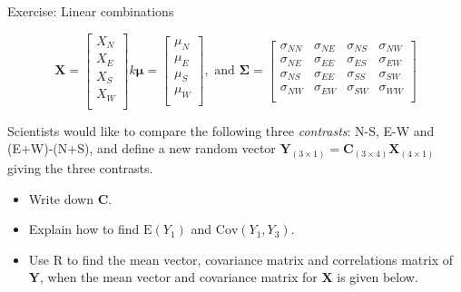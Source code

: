 \documentclass[ignorenonframetext,]{beamer}
\providecommand{\tightlist}{%
  \setlength{\itemsep}{0pt}\setlength{\parskip}{0pt}}
\begin{document}
\begin{frame}

\begin{block}{Exercise: Linear combinations}

\[\mathbf{X}=\left[ \begin{array}{c} X_N\\
          X_E\\
X_S\\
          X_W\\
          \end{array}
          \right]k
          \mathbf{\mu}=\left[
      \begin{array}{c} \mu_N\\
          \mu_E\\
\mu_S\\
          \mu_W\\
          \end{array}
          \right], \text{ and } \mathbf\Sigma=\left[ \begin{array}{cccc}
    \sigma_{NN} & \sigma_{NE} & \sigma_{NS} & \sigma_{NW}\\
    \sigma_{NE} & \sigma_{EE} & \sigma_{ES}& \sigma_{EW}\\
        \sigma_{NS} & \sigma_{EE} & \sigma_{SS}& \sigma_{SW}\\
    \sigma_{NW} & \sigma_{EW} & \sigma_{SW} & \sigma_{WW}\\
\end{array} \right]\]

Scientists would like to compare the following three \emph{contrasts}:
N-S, E-W and (E+W)-(N+S), and define a new random vector
\(\mathbf{Y}_{(3\times 1)}=\mathbf{C}_{(3\times 4)} \mathbf{X}_{(4\times 1)}\)
giving the three contrasts.

\begin{itemize}
\tightlist
\item
  Write down \(\mathbf{C}\).
\item
  Explain how to find \(\text{E}(Y_1)\) and \(\text{Cov}(Y_1,Y_3)\).
\item
  Use R to find the mean vector, covariance matrix and correlations
  matrix of \(\mathbf{Y}\), when the mean vector and covariance matrix
  for \(\mathbf{X}\) is given below.
\end{itemize}

\end{block}

\end{frame}
\end{document}
